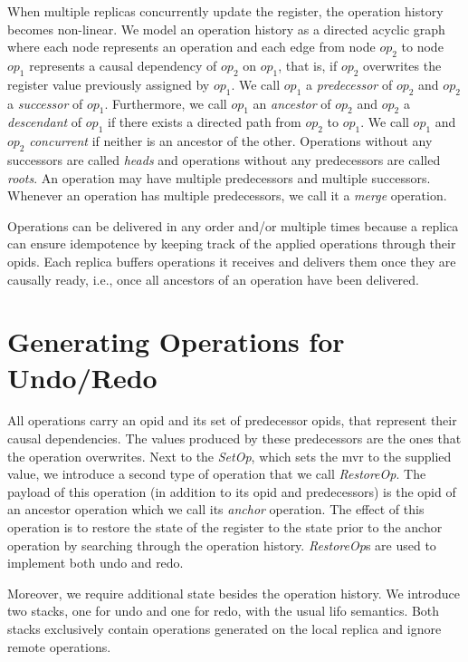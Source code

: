 \documentclass[sigplan]{acmart}
\newcommand{\op}[3][op]{$\mathit{#1}_{#2}^{#3}$} %
\newcommand{\setopkind}{\textit{SetOp}}
\newcommand{\restopkind}{\textit{RestoreOp}}
\begin{document}
When multiple replicas concurrently update the register,
the operation history becomes non-linear.
We model an operation history as a directed acyclic graph
where each node represents an operation and 
each edge from node \op{2}{} to node \op{1}{}
represents a causal dependency of \op{2}{} on \op{1}{}, that is, if
\op{2}{} overwrites the register value previously assigned by \op{1}{}.
We call \op{1}{} a \emph{predecessor} of \op{2}{} and
\op{2}{} a \emph{successor} of \op{1}{}.
Furthermore, we call \op{1}{} an \emph{ancestor} of \op{2}{} and
\op{2}{} a \emph{descendant} of \op{1}{} if there exists a directed
path from \op{2}{} to \op{1}{}.
We call \op{1}{} and \op{2}{} \emph{concurrent} if neither is an ancestor of the
other.
Operations without any successors are called \emph{heads} and
operations without any predecessors are called \emph{roots}.
An operation may have multiple predecessors and multiple successors.
Whenever an operation has multiple predecessors, we call it a \emph{merge} operation.

Operations can be delivered in any order and/or multiple
times because a replica can ensure idempotence by
keeping track of the applied operations through their \glspl*{opid}.
Each replica buffers operations it receives and delivers them
once they are causally ready, i.e., once all ancestors of an operation
have been delivered.

\section{Generating Operations for Undo/Redo}\label{sec:overview}

All operations carry an \gls*{opid} and its set of predecessor \glspl*{opid},
that represent their causal dependencies.
The values produced by these predecessors are the ones that the operation
overwrites.
Next to the \setopkind{}, which sets the \gls{mvr} to the supplied value,
we introduce a second type of operation that we call \restopkind{}.
The payload of this operation (in addition to its \gls*{opid} and predecessors)
is the \gls*{opid} of an ancestor operation which we call its
\emph{anchor} operation.
The effect of this operation is to restore the state of the register to the
state prior to the anchor operation by searching through the operation history.
\restopkind{}s are used to implement both undo and redo.

Moreover, we require additional state besides the operation history.
We introduce two stacks, one for undo and one for redo, with the usual
\acrlong{lifo} semantics.
Both stacks exclusively contain operations generated on the local replica and
ignore remote operations.
\end{document}
